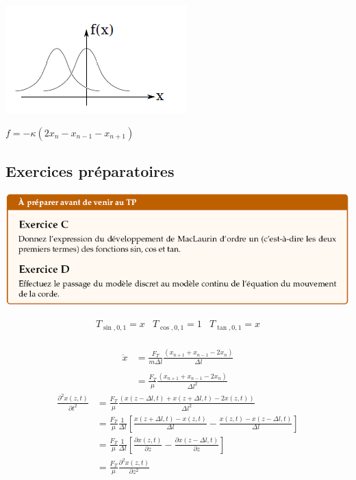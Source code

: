 \documentclass	[11pt, a4paper, openany]{book}
\begin{document}
\begin{center}
\includegraphics[scale=0.85]{prepa/Q16.png}
\end{center}


$f=-\kappa(2x_n-x_{n-1}-x_{n+1})$



	\subsection{Exercices préparatoires}
	
\begin{center}
\includegraphics[scale=0.85]{prepa/Ondes-CD.png}\\
\end{center}

$$\begin{array}{lcr} T_{\sin,0,1}=x & T_{\cos,0,1}=1 & T_{\tan,0,1}=x\end{array}$$\\
\begin{align*}
\ddot{x} & =\frac{F_T}{m\Delta l}\frac{(x_{n+1}+x_{n-1}-2x_n)}{\Delta l}\\\\
 & =\frac{F_T}{\mu}\frac{(x_{n+1}+x_{n-1}-2x_n)}{\Delta l^2}\end{align*}
\begin{align*}
\frac{\partial^2 x(z,t)}{\partial t^2} & =\frac{F_T}{\mu}\frac{(x(z-\Delta l,t)+x(z+\Delta l, t)-2x(z,t))}{\Delta l^2}\\
 & =\frac{F_T}{\mu}\frac{1}{\Delta l}\left[\frac{x(z+\Delta l,t)-x(z,t)}{\Delta l}-\frac{x(z,t)-x(z-\Delta l,t)}{\Delta l}\right]\\
 & =\frac{F_T}{\mu}\frac{1}{\Delta l}\left[\frac{\partial x(z,t)}{\partial z}-\frac{\partial x(z-\Delta l,t)}{\partial z}\right]\\
  & =\frac{F_T}{\mu}\frac{\partial^2x(z,t)}{\partial z^2}
\end{align*}
\end{document}
